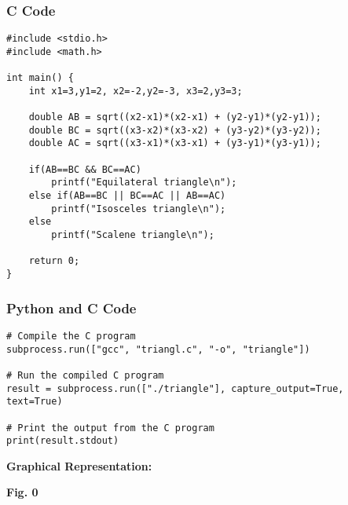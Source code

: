 \documentclass{beamer}
\begin{document}
\begin{frame}[fragile]
\frametitle{C Code}
\begin{lstlisting}
#include <stdio.h>
#include <math.h>

int main() {
    int x1=3,y1=2, x2=-2,y2=-3, x3=2,y3=3;

    double AB = sqrt((x2-x1)*(x2-x1) + (y2-y1)*(y2-y1));
    double BC = sqrt((x3-x2)*(x3-x2) + (y3-y2)*(y3-y2));
    double AC = sqrt((x3-x1)*(x3-x1) + (y3-y1)*(y3-y1));

    if(AB==BC && BC==AC)
        printf("Equilateral triangle\n");
    else if(AB==BC || BC==AC || AB==AC)
        printf("Isosceles triangle\n");
    else
        printf("Scalene triangle\n");

    return 0;
}

\end{lstlisting}

\end{frame}



    \begin{frame}[fragile]
\frametitle{Python and C Code}

\begin{lstlisting}
# Compile the C program
subprocess.run(["gcc", "triangl.c", "-o", "triangle"])

# Run the compiled C program
result = subprocess.run(["./triangle"], capture_output=True, text=True)

# Print the output from the C program 
print(result.stdout)
\end{lstlisting}

\end{frame}

\textbf{Graphical Representation:}

\begin{center}
    
    \vspace{0.5cm} %
    \textbf{Fig. 0}

\end{center}
\end{document}
